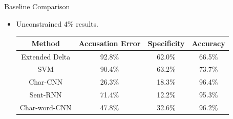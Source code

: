 \documentclass[10pt]{beamer}
\begin{document}
\begin{frame}[fragile]{Baseline Comparison}
    \begin{itemize}
        \item Unconstrained 4\% results.
            \begin{center}
                \begin{tabular}{c|ccc}
                    \textbf{Method}      & \textbf{Accusation Error} &
                    \textbf{Specificity} & \textbf{Accuracy}
                    \\ \hline
                    Extended Delta       & 92.8\%                    &
                    62.0\%               & 66.5\%
                    \\
                    SVM                  & 90.4\%                    &
                    63.2\%               & 73.7\%
                    \\
                    Char-CNN             & 26.3\%                    &
                    18.3\%               & 96.4\%
                    \\
                    Sent-RNN             & 71.4\%                    &
                    12.2\%               & 95.3\%
                    \\
                    Char-word-CNN        & 47.8\%                    &
                    32.6\%               & 96.2\%
                \end{tabular}
            \end{center}
    \end{itemize}
\end{frame}
\end{document}
